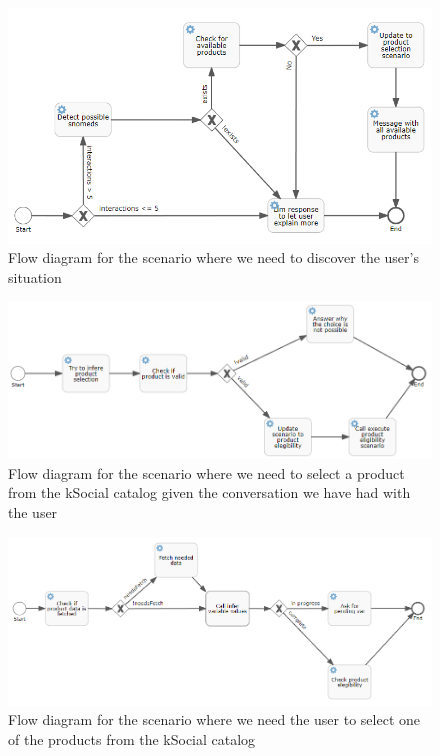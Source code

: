 \documentclass[a4paper,12pt,twoside]{ThesisStyle}
\begin{document}
\begin{figure}[htb]
  \centering
  \includegraphics[width=1\textwidth]{imatges/4_1_DsoExecuteSituationDiscoveryScenario.png}
  \caption{Flow diagram for the scenario where we need to discover the user's situation}
\end{figure}

\begin{figure}[htb]
  \centering
  \includegraphics[width=1\textwidth]{imatges/4_2_DsoExecuteProductSelectionScenario.png}
  \caption{Flow diagram for the scenario where we need to select a product from the kSocial catalog given the conversation we have had with the user}
\end{figure}

\begin{figure}[htb]
  \centering
  \includegraphics[width=1\textwidth]{imatges/4_3_DsoProductElegibilityScenario.png}
  \caption{Flow diagram for the scenario where we need the user to select one of the products from the kSocial catalog}
\end{figure}
\end{document}
